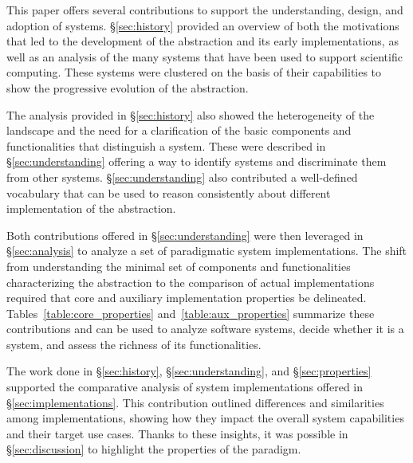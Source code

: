 \documentclass{sig-alternate}
\begin{document}


This paper offers several contributions to support the understanding, design,
and adoption of \pilot systems. \S\ref{sec:history} provided an overview of both
the motivations that led to the development of the \pilot abstraction and its
early implementations, as well as an analysis of the many \pilot systems that
have been used to support scientific computing. These systems were clustered on
the basis of their capabilities to show the progressive evolution of
the \pilot abstraction.


The analysis provided in \S\ref{sec:history} also showed the heterogeneity of
the \pilot landscape and the need for a clarification of the basic components
and functionalities that distinguish a \pilot system. These were described in
\S\ref{sec:understanding} offering a way to identify \pilot systems and
discriminate them from other systems. \S\ref{sec:understanding} also contributed
a well-defined vocabulary that can be used to reason consistently about
different implementation of the \pilot abstraction.


Both contributions offered in \S\ref{sec:understanding} were then leveraged in
\S\ref{sec:analysis} to analyze a set of paradigmatic \pilot system
implementations. The shift from understanding the minimal set of components and
functionalities characterizing the \pilot abstraction to the comparison of
actual \pilot implementations required that core and auxiliary implementation
properties be delineated. Tables~\ref{table:core_properties}
and~\ref{table:aux_properties} summarize these contributions and can be used to
analyze software systems, decide whether it is a \pilot system, and assess the
richness of its functionalities.

The work done in \S\ref{sec:history}, \S\ref{sec:understanding}, and
\S\ref{sec:properties} supported the comparative analysis of \pilot system
implementations offered in \S\ref{sec:implementations}. This contribution
outlined differences and similarities among implementations, showing how they
impact  the overall \pilot system capabilities and their target use cases.
Thanks to these insights, it was possible in \S\ref{sec:discussion} to highlight
the properties of the \pilot paradigm.
\end{document}
